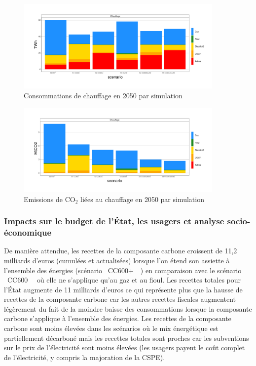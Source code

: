 \documentclass[10.5pt,a4paper]{article}
\begin{document}
{\begin{figure}[h!]
\centering 
\caption{Consommations de chauffage en 2050 par simulation}\label{comp_cible_AMS_energie_chauffage-CC}  
\includegraphics[width = 0.9\textwidth]{comp_cible_AMS_energie_chauffage-CC}  
\end{figure}

\begin{figure}[h!]
\centering 
\caption{Emissions de CO$_2$ liées au chauffage en 2050 par simulation}\label{Em_chauffage_2050-CC}  
\includegraphics[width = 0.9\textwidth]{Em_chauffage_2050-CC}  
\end{figure}


\clearpage

\subsubsection{Impacts sur le budget de l’État, les usagers et analyse socio-économique}

De manière attendue, les recettes de la composante carbone croissent de 11,2 milliards d'euros (cumulées et actualisées) lorsque l'on étend son assiette à l'ensemble des énergies (scénario  \og~CC600+~\fg~) en comparaison avec le scénario \og~CC600~\fg~ où elle ne s'applique qu'au gaz et au fioul. Les recettes totales pour l’État augmente de 11 milliards d'euros ce qui représente plus que la hausse de recettes de la composante carbone car les autres recettes fiscales augmentent légèrement du fait de la moindre baisse des consommations lorsque la composante carbone s'applique à l'ensemble des énergies. Les recettes de la composante carbone sont moins élevées dans les scénarios où le mix énergétique est partiellement décarboné mais les recettes totales sont proches car les subventions sur le prix de l'électricité sont moins élevées (les usagers payent le coût complet de l'électricité, y compris la majoration de la CSPE).

}
\end{document}

